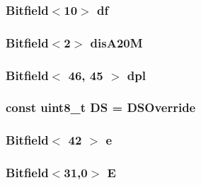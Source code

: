 \label{namespaceX86ISA_a4b961bdf11c0bc3384446cb6b52a09fe}
\hypertarget{namespaceX86ISA_a127f55f62798fb91f307946afe9153f6}{
\subsubsection[{df}]{\setlength{\rightskip}{0pt plus 5cm}Bitfield$<$10$>$ {\bf df}}}
\label{namespaceX86ISA_a127f55f62798fb91f307946afe9153f6}
\hypertarget{namespaceX86ISA_abbe3c22a13da8716f42f23325f19c04d}{
\subsubsection[{disA20M}]{\setlength{\rightskip}{0pt plus 5cm}Bitfield$<$2$>$ {\bf disA20M}}}
\label{namespaceX86ISA_abbe3c22a13da8716f42f23325f19c04d}
\hypertarget{namespaceX86ISA_a41dffe4aaa71ac7f06703ded48a8d507}{
\subsubsection[{dpl}]{\setlength{\rightskip}{0pt plus 5cm}Bitfield$<$ 46, 45 $>$ {\bf dpl}}}
\label{namespaceX86ISA_a41dffe4aaa71ac7f06703ded48a8d507}
\hypertarget{namespaceX86ISA_ae9333134a9641c88d32b14331583b8ab}{
\subsubsection[{DS}]{\setlength{\rightskip}{0pt plus 5cm}const uint8\_\-t {\bf DS} = DSOverride}}
\label{namespaceX86ISA_ae9333134a9641c88d32b14331583b8ab}
\hypertarget{namespaceX86ISA_a987882f11918e924dbd860f28b1d495a}{
\subsubsection[{e}]{\setlength{\rightskip}{0pt plus 5cm}Bitfield$<$ 42 $>$ {\bf e}}}
\label{namespaceX86ISA_a987882f11918e924dbd860f28b1d495a}
\hypertarget{namespaceX86ISA_a71b154dead8fe7930c20fe9b4ce8ae3b}{
\subsubsection[{E}]{\setlength{\rightskip}{0pt plus 5cm}Bitfield$<$31,0$>$ {\bf E}}}
